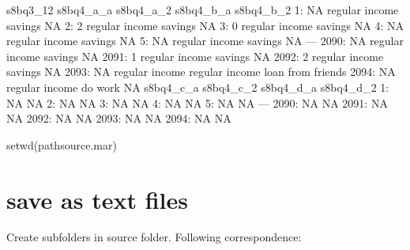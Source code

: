 \begin{Schunk}
\begin{Soutput}
      s8bq3_12      s8bq4_a_a      s8bq4_a_2         s8bq4_b_a s8bq4_b_2
   1:       NA regular income        savings                NA          
   2:        2 regular income        savings                NA          
   3:        0 regular income        savings                NA          
   4:       NA regular income        savings                NA          
   5:       NA regular income        savings                NA          
  ---                                                                   
2090:       NA regular income        savings                NA          
2091:        1 regular income        savings                NA          
2092:        2 regular income        savings                NA          
2093:       NA regular income regular income loan from friends          
2094:       NA regular income        do work                NA          
      s8bq4_c_a s8bq4_c_2 s8bq4_d_a s8bq4_d_2
   1:        NA                  NA          
   2:        NA                  NA          
   3:        NA                  NA          
   4:        NA                  NA          
   5:        NA                  NA          
  ---                                        
2090:        NA                  NA          
2091:        NA                  NA          
2092:        NA                  NA          
2093:        NA                  NA          
2094:        NA                  NA          
\end{Soutput}
\begin{Sinput}
setwd(pathsource.mar)
\end{Sinput}
\end{Schunk}

\section{save as text files}

Create subfolders in \textsf{source} folder. Following correspondence:

